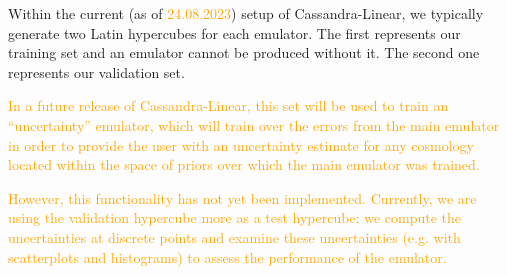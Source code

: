 Within the current (as of \textcolor{orange}{24.08.2023}) setup of
Cassandra-Linear, we typically generate two Latin hypercubes for each
emulator. The first represents our training set and an emulator cannot be
produced without it. The second one represents our validation set.

\textcolor{orange}{In a future
release of Cassandra-Linear, this set will be used to train an ``uncertainty''
emulator, which will train over the errors from the main emulator in order to
provide the user with an uncertainty estimate for any cosmology located within 
the space of priors over which the main emulator was trained.} 

\textcolor{orange}{However, this functionality has not yet been implemented. 
Currently, we are 
using the validation hypercube more as a test hypercube: we compute the uncertainties at discrete points and examine these uncertainties (e.g. with
scatterplots and histograms) to assess the performance of the emulator.}
